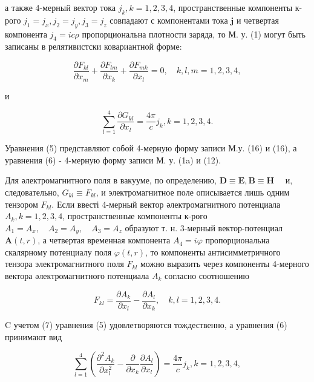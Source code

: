 \documentclass[10pt]{article}
\begin{document}
а также 4-мерный вектор тока $j_{k}, k=1,2,3,4$, пространственные компоненты к-рого $j_{1}=j_{x}, j_{2}=j_{y}, j_{3}=j_{z}$ совпадают с компонентами тока $\boldsymbol{j}$ и четвертая компонента $j_{4}=i c \rho$ пропорциональна плотности заряда, то М. у. (1) могут быть записаны в релятивистски ковариантной форме:



\[

\frac{\partial F_{k l}}{\partial x_{m}}+\frac{\partial F_{l m}}{\partial x_{k}}+\frac{\partial F_{m k}}{\partial x_{l}}=0, \quad k, l, m=1,2,3,4,

\]



и



\[

\sum_{l=1}^{4} \frac{\partial G_{k l}}{\partial x_{l}}=\frac{4 \pi}{c} j_{k}, k=1,2,3,4 .

\]



Уравнения (5) представляют собой 4-мерную форму записи М.у. (16) и (16), а уравнения (6) - 4-мерную форму записи М. у. (1a) и (12).



Для әлектромагнитного поля в вакууме, по определению, $\boldsymbol{D} \equiv \boldsymbol{E}, \boldsymbol{B} \equiv \boldsymbol{H} \quad$ и, следовательно, $G_{k l} \equiv F_{k l}$, и электромагнитное поле описывается лишь одним тензором $F_{k l}$. Если ввесті 4-мерный вектор әлектромагнитного потенциала $A_{k}, k=1,2,3,4$, пространственные компоненты к-рого $A_{1}=A_{x}, \quad A_{2}=A_{y}, \quad A_{3}=A_{z}$ образуют т. н. 3-мерный вектор-потенциал $\boldsymbol{A}(t, r)$, а четвертая временная компонента $A_{4}=i \varphi$ пропорциональна скалярному потенциалу поля $\varphi(t, r)$, то компоненты антисимметричного тензора электромагнитного поля $F_{k l}$ можно выразить через компоненты 4-мерного вектора әлектромагнитного потенциала $A_{k}$ согласно соотношению



\[

F_{k l}=\frac{\partial A_{k}}{\partial x_{l}}-\frac{\partial A_{l}}{\partial x_{k}}, \quad k, l=1,2,3,4 .

\]



C учетом (7) уравнения (5) удовлетворяются тождественно, а уравнения (6) принимают вид



\[

\sum_{l=1}^{4}\left(\frac{\partial^{2} A_{k}}{\partial x_{l}^{2}}-\frac{\partial}{\partial x_{k}} \frac{\partial A_{l}}{\partial x_{l}}\right)=\frac{4 \pi}{c} j_{k}, k=1,2,3,4,

\]
\end{document}
